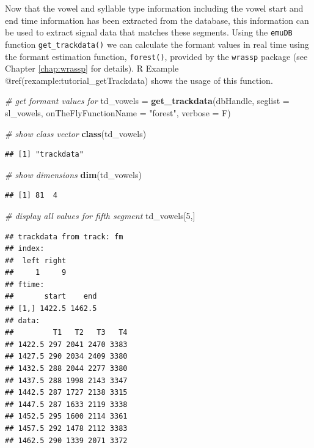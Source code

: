 \documentclass[]{book}
\newenvironment{Shaded}{\begin{snugshade}}{\end{snugshade}}
\newcommand{\KeywordTok}[1]{\textcolor[rgb]{0.13,0.29,0.53}{\textbf{{#1}}}}
\newcommand{\DataTypeTok}[1]{\textcolor[rgb]{0.13,0.29,0.53}{{#1}}}
\newcommand{\DecValTok}[1]{\textcolor[rgb]{0.00,0.00,0.81}{{#1}}}
\newcommand{\StringTok}[1]{\textcolor[rgb]{0.31,0.60,0.02}{{#1}}}
\newcommand{\CommentTok}[1]{\textcolor[rgb]{0.56,0.35,0.01}{\textit{{#1}}}}
\newcommand{\NormalTok}[1]{{#1}}
\theoremstyle{definition}
\theoremstyle{definition}
\theoremstyle{definition}
\theoremstyle{remark}
\begin{document}
Now that the vowel and syllable type information including the vowel
start and end time information has been extracted from the database,
this information can be used to extract signal data that matches these
segments. Using the \texttt{emuDB} function \texttt{get\_trackdata()} we
can calculate the formant values in real time using the formant
estimation function, \texttt{forest()}, provided by the \texttt{wrassp}
package (see Chapter \ref{chap:wrassp} for details). R Example
@ref(rexample:tutorial\_getTrackdata) shows the usage of this function.

\begin{Shaded}
\begin{Highlighting}[]
\CommentTok{# get formant values for}
\NormalTok{td_vowels =}\StringTok{ }\KeywordTok{get_trackdata}\NormalTok{(dbHandle,}
                          \DataTypeTok{seglist =} \NormalTok{sl_vowels,}
                          \DataTypeTok{onTheFlyFunctionName =} \StringTok{"forest"}\NormalTok{,}
                          \DataTypeTok{verbose =} \NormalTok{F)}

\CommentTok{# show class vector}
\KeywordTok{class}\NormalTok{(td_vowels)}
\end{Highlighting}
\end{Shaded}

\begin{verbatim}
## [1] "trackdata"
\end{verbatim}

\begin{Shaded}
\begin{Highlighting}[]
\CommentTok{# show dimensions}
\KeywordTok{dim}\NormalTok{(td_vowels)}
\end{Highlighting}
\end{Shaded}

\begin{verbatim}
## [1] 81  4
\end{verbatim}

\begin{Shaded}
\begin{Highlighting}[]
\CommentTok{# display all values for fifth segment}
\NormalTok{td_vowels[}\DecValTok{5}\NormalTok{,]}
\end{Highlighting}
\end{Shaded}

\begin{verbatim}
## trackdata from track: fm 
## index:
##  left right
##     1     9
## ftime:
##       start    end
## [1,] 1422.5 1462.5
## data:
##         T1   T2   T3   T4
## 1422.5 297 2041 2470 3383
## 1427.5 290 2034 2409 3380
## 1432.5 288 2044 2277 3380
## 1437.5 288 1998 2143 3347
## 1442.5 287 1727 2138 3315
## 1447.5 287 1633 2119 3338
## 1452.5 295 1600 2114 3361
## 1457.5 292 1478 2112 3383
## 1462.5 290 1339 2071 3372
\end{verbatim}
\end{document}
